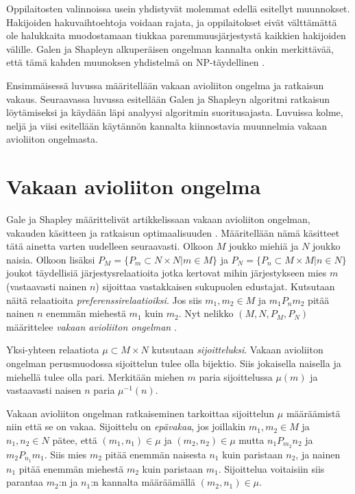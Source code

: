 \documentclass[gradu, twoside]{tktltiki}
\begin{document}
Oppilaitosten valinnoissa usein yhdistyvät molemmat edellä esitellyt
muunnokset. Hakijoiden hakuvaihtoehtoja voidaan rajata, ja
oppilaitokset eivät välttämättä ole halukkaita muodostamaan tiukkaa
paremmuusjärjestystä kaikkien hakijoiden välille. Galen ja Shapleyn
alkuperäisen ongelman kannalta onkin merkittävää, että tämä kahden
muunoksen yhdistelmä on NP-täydellinen \cite{manlove02}.

Ensimmäisessä luvussa määritellään vakaan avioliiton ongelma ja
ratkaisun vakaus. Seuraavassa luvussa esitellään Galen ja Shapleyn
algoritmi ratkaisun löytämiseksi ja käydään läpi analyysi algoritmin
suoritusajasta. Luvuissa kolme, neljä ja viisi esitellään käytännön
kannalta kiinnostavia muunnelmia vakaan avioliiton ongelmasta.

\section{Vakaan avioliiton ongelma}

Gale ja Shapley määrittelivät artikkelissaan vakaan avioliiton
ongelman, vakauden käsitteen ja ratkaisun optimaalisuuden
\cite{galeshapley62}. Määritellään nämä käsitteet tätä ainetta varten
uudelleen seuraavasti. Olkoon $M$ joukko miehiä ja $N$ joukko naisia.
Olkoon lisäksi $P_M = \{P_m \subset N \times N | m \in M\}$ ja $P_N =
\{P_n \subset M \times M | n \in N\}$ joukot täydellisiä
järjestysrelaatioita jotka kertovat mihin järjestykseen mies $m$
(vastaavasti nainen $n$) sijoittaa vastakkaisen sukupuolen edustajat.
Kutsutaan näitä relaatioita \emph{preferenssirelaatioiksi}. Jos siis
$m_1,m_2 \in M$ ja $m_1P_nm_2$ pitää nainen $n$ enemmän miehestä $m_1$
kuin $m_2$. Nyt nelikko $(M, N, P_M, P_N)$ määrittelee \emph{vakaan
  avioliiton ongelman }.

Yksi-yhteen relaatiota $\mu \subset M \times N$ kutsutaan
\emph{sijoitteluksi}. Vakaan avioliiton ongelman perusmuodossa
sijoittelun tulee olla bijektio. Siis jokaisella naisella ja miehellä
tulee olla pari. Merkitään miehen $m$ paria sijoittelussa $\mu(m)$ ja
vastaavasti naisen $n$ paria $\mu^{-1}(n)$.

Vakaan avioliiton ongelman ratkaiseminen tarkoittaa sijoittelun $\mu$
määräämistä niin että se on vakaa. Sijoittelu on \emph{epävakaa}, jos
joillakin $m_1, m_2 \in M$ ja $n_1, n_2 \in N$ pätee, että $(m_1, n_1)
\in \mu$ ja $(m_2, n_2) \in \mu$ mutta $n_1P_{m_2}n_2$ ja
$m_2P_{n_1}m_1$. Siis mies $m_2$ pitää enemmän naisesta $n_1$ kuin
paristaan $n_2$, ja nainen $n_1$ pitää enemmän miehestä $m_2$ kuin
paristaan $m_1$. Sijoittelua voitaisiin siis parantaa $m_2$:n ja
$n_1$:n kannalta määräämällä $(m_2, n_1) \in \mu$.
\end{document}
